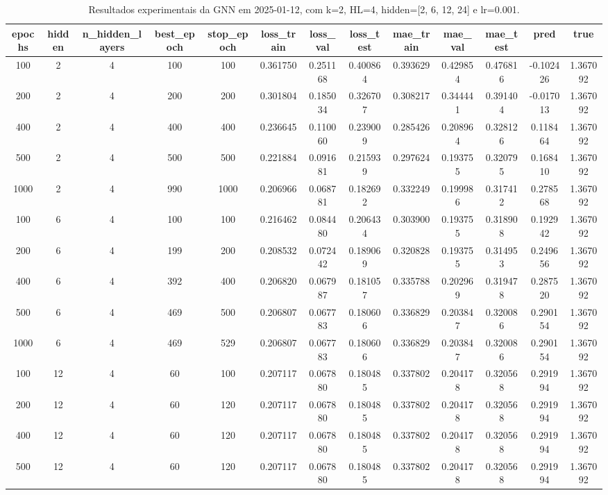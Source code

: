 \begin{table}[h]
\centering
\caption{Resultados experimentais da GNN em 2025-01-12, com k=2, HL=4, hidden=[2, 6, 12, 24] e lr=0.001.}
\label{tab:gnn_results_k2_hl4_d20250112}
\begin{tabular}{ccccccccccccc}
\toprule
epochs & hidden & n\_hidden\_layers & best\_epoch & stop\_epoch & loss\_train & loss\_val & loss\_test & mae\_train & mae\_val & mae\_test & pred & true \\
\midrule
100 & 2 & 4 & 100 & 100 & 0.361750 & 0.251168 & 0.400864 & 0.393629 & 0.429854 & 0.476816 & -0.102426 & 1.367092 \\
200 & 2 & 4 & 200 & 200 & 0.301804 & 0.185034 & 0.326707 & 0.308217 & 0.344441 & 0.391404 & -0.017013 & 1.367092 \\
400 & 2 & 4 & 400 & 400 & 0.236645 & 0.110060 & 0.239009 & 0.285426 & 0.208964 & 0.328126 & 0.118464 & 1.367092 \\
500 & 2 & 4 & 500 & 500 & 0.221884 & 0.091681 & 0.215939 & 0.297624 & 0.193755 & 0.320795 & 0.168410 & 1.367092 \\
1000 & 2 & 4 & 990 & 1000 & 0.206966 & 0.068781 & 0.182692 & 0.332249 & 0.199986 & 0.317412 & 0.278568 & 1.367092 \\
100 & 6 & 4 & 100 & 100 & 0.216462 & 0.084480 & 0.206434 & 0.303900 & 0.193755 & 0.318908 & 0.192942 & 1.367092 \\
200 & 6 & 4 & 199 & 200 & 0.208532 & 0.072442 & 0.189069 & 0.320828 & 0.193755 & 0.314953 & 0.249656 & 1.367092 \\
400 & 6 & 4 & 392 & 400 & 0.206820 & 0.067987 & 0.181057 & 0.335788 & 0.202969 & 0.319478 & 0.287520 & 1.367092 \\
500 & 6 & 4 & 469 & 500 & 0.206807 & 0.067783 & 0.180606 & 0.336829 & 0.203847 & 0.320086 & 0.290154 & 1.367092 \\
1000 & 6 & 4 & 469 & 529 & 0.206807 & 0.067783 & 0.180606 & 0.336829 & 0.203847 & 0.320086 & 0.290154 & 1.367092 \\
100 & 12 & 4 & 60 & 100 & 0.207117 & 0.067880 & 0.180485 & 0.337802 & 0.204178 & 0.320568 & 0.291994 & 1.367092 \\
200 & 12 & 4 & 60 & 120 & 0.207117 & 0.067880 & 0.180485 & 0.337802 & 0.204178 & 0.320568 & 0.291994 & 1.367092 \\
400 & 12 & 4 & 60 & 120 & 0.207117 & 0.067880 & 0.180485 & 0.337802 & 0.204178 & 0.320568 & 0.291994 & 1.367092 \\
500 & 12 & 4 & 60 & 120 & 0.207117 & 0.067880 & 0.180485 & 0.337802 & 0.204178 & 0.320568 & 0.291994 & 1.367092 \\

\end{tabular}
\end{table}
